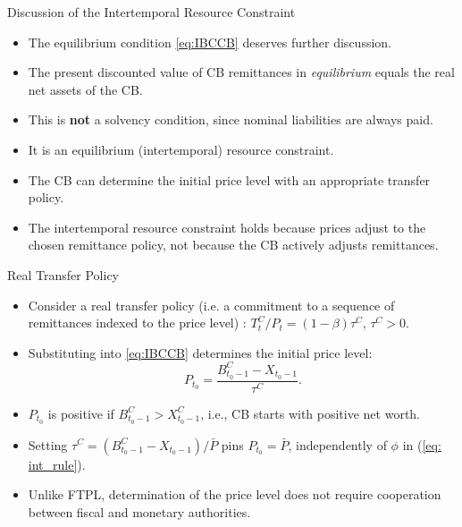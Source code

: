 \documentclass[11pt,aspectratio=169]{beamer}
\begin{document}
\begin{frame}{Discussion of the Intertemporal Resource Constraint}
\begin{itemize}
    \item The equilibrium condition \eqref{eq:IBCCB} deserves further discussion.
    \vspace{0.25cm}
    \item The present discounted value of CB remittances in \textit{equilibrium} equals the real net assets of the CB.
\vspace{0.25cm}
\item This is \textbf{not} a solvency condition, since nominal liabilities are always paid.
\vspace{0.25cm}
\item It is an equilibrium (intertemporal) resource constraint.

\vspace{0.25cm}
\item The CB can determine the initial price level with an appropriate transfer policy.

\vspace{0.25cm}
\item The intertemporal resource constraint holds because prices adjust to the chosen remittance policy, not because the CB actively adjusts remittances.

\end{itemize}
\end{frame}

\begin{frame}{Real Transfer Policy}
\begin{itemize}
    \item Consider a real transfer policy (i.e. a commitment to a sequence of remittances indexed to the price level) : $T_t^C / P_t = (1-\beta) \tau^C$, $\tau^C>0$.
    \vspace{0.25cm}
    \item Substituting into \eqref{eq:IBCCB} determines the initial price level:
    \begin{equation} \label{PdetC}
        P_{t_0} = \frac{B_{t_0-1}^C - X_{t_0-1}}{\tau^C}.
    \end{equation}
    \vspace{0.25cm}
    \item $P_{t_0}$ is positive if $B_{t_0-1}^C > X_{t_0-1}^C$, i.e., CB starts with positive net worth.
    \item Setting $\tau^C = (B_{t_0-1}^C - X_{t_0-1}) / \bar P$ pins $P_{t_0} = \bar P$, independently of $\phi$ in (\ref{eq: int_rule}).
    \vspace{0.25cm}
    \item Unlike FTPL, determination of the price level does not require cooperation between fiscal and monetary authorities.
\end{itemize}
\end{frame}
\end{document}
